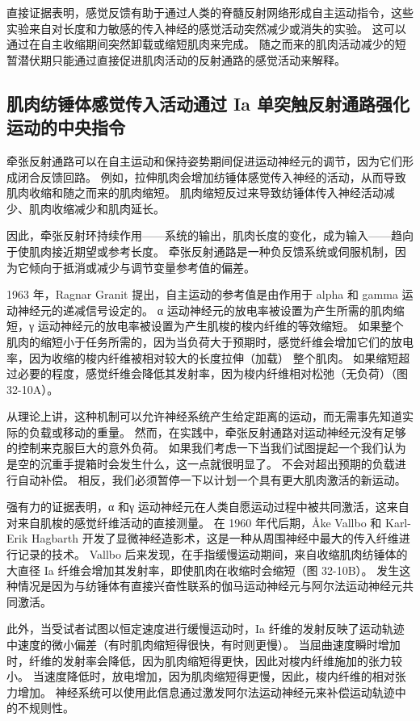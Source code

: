直接证据表明，感觉反馈有助于通过人类的脊髓反射网络形成自主运动指令，这些实验来自对长度和力敏感的传入神经的感觉活动突然减少或消失的实验。 这可以通过在自主收缩期间突然卸载或缩短肌肉来完成。 随之而来的肌肉活动减少的短暂潜伏期只能通过直接促进肌肉活动的反射通路的感觉活动来解释。

\subsection{肌肉纺锤体感觉传入活动通过 Ia 单突触反射通路强化运动的中央指令}
牵张反射通路可以在自主运动和保持姿势期间促进运动神经元的调节，因为它们形成闭合反馈回路。 例如，拉伸肌肉会增加纺锤体感觉传入神经的活动，从而导致肌肉收缩和随之而来的肌肉缩短。 肌肉缩短反过来导致纺锤体传入神经活动减少、肌肉收缩减少和肌肉延长。

因此，牵张反射环持续作用——系统的输出，肌肉长度的变化，成为输入——趋向于使肌肉接近期望或参考长度。 牵张反射通路是一种负反馈系统或伺服机制，因为它倾向于抵消或减少与调节变量参考值的偏差。

1963 年，Ragnar Granit 提出，自主运动的参考值是由作用于 alpha 和 gamma 运动神经元的递减信号设定的。 α 运动神经元的放电率被设置为产生所需的肌肉缩短，γ 运动神经元的放电率被设置为产生肌梭的梭内纤维的等效缩短。 如果整个肌肉的缩短小于任务所需的，因为当负荷大于预期时，感觉纤维会增加它们的放电率，因为收缩的梭内纤维被相对较大的长度拉伸（加载） 整个肌肉。 如果缩短超过必要的程度，感觉纤维会降低其发射率，因为梭内纤维相对松弛（无负荷）（图 32-10A）。

从理论上讲，这种机制可以允许神经系统产生给定距离的运动，而无需事先知道实际的负载或移动的重量。 然而，在实践中，牵张反射通路对运动神经元没有足够的控制来克服巨大的意外负荷。 如果我们考虑一下当我们试图提起一个我们认为是空的沉重手提箱时会发生什么，这一点就很明显了。 不会对超出预期的负载进行自动补偿。 相反，我们必须暂停一下以计划一个具有更大肌肉激活的新运动。

强有力的证据表明，α 和γ 运动神经元在人类自愿运动过程中被共同激活，这来自对来自肌梭的感觉纤维活动的直接测量。 在 1960 年代后期，Åke Vallbo 和 Karl-Erik Hagbarth 开发了显微神经造影术，这是一种从周围神经中最大的传入纤维进行记录的技术。 Vallbo 后来发现，在手指缓慢运动期间，来自收缩肌肉纺锤体的大直径 Ia 纤维会增加其发射率，即使肌肉在收缩时会缩短（图 32-10B）。 发生这种情况是因为与纺锤体有直接兴奋性联系的伽马运动神经元与阿尔法运动神经元共同激活。

此外，当受试者试图以恒定速度进行缓慢运动时，Ia 纤维的发射反映了运动轨迹中速度的微小偏差（有时肌肉缩短得很快，有时则更慢）。 当屈曲速度瞬时增加时，纤维的发射率会降低，因为肌肉缩短得更快，因此对梭内纤维施加的张力较小。 当速度降低时，放电增加，因为肌肉缩短得更慢，因此，梭内纤维的相对张力增加。 神经系统可以使用此信息通过激发阿尔法运动神经元来补偿运动轨迹中的不规则性。

